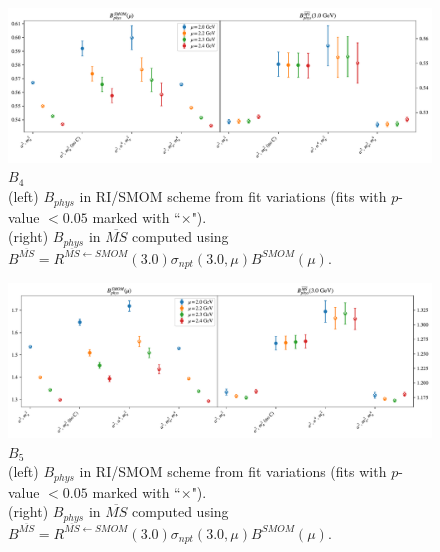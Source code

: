 \documentclass[12pt]{extarticle}
\begin{document}
\clearpage
\begin{figure}
\centering
\includegraphics[page=1, width=1.1\textwidth]{SSpPP/NPR/fit_summary.pdf}
\caption{$B_{4}$\\(left) $B_{phys}$ in RI/SMOM scheme from fit variations (fits with $p$-value $<0.05$ marked with ``$\times$"). \\(right) $B_{phys}$ in $\overline{MS}$ computed using $B^{\overline{MS}} = R^{\overline{MS}\leftarrow SMOM}(3.0)\sigma_{npt}(3.0,\mu) B^{SMOM}(\mu)$.}
\end{figure}
\clearpage
\begin{figure}
\centering
\includegraphics[page=1, width=1.1\textwidth]{TT/NPR/fit_summary.pdf}
\caption{$B_{5}$\\(left) $B_{phys}$ in RI/SMOM scheme from fit variations (fits with $p$-value $<0.05$ marked with ``$\times$"). \\(right) $B_{phys}$ in $\overline{MS}$ computed using $B^{\overline{MS}} = R^{\overline{MS}\leftarrow SMOM}(3.0)\sigma_{npt}(3.0,\mu) B^{SMOM}(\mu)$.}
\end{figure}
\clearpage
\end{document}
